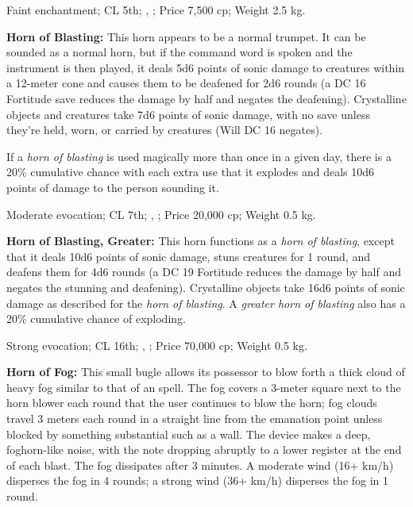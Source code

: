 Faint enchantment; CL 5th; , ; Price 7,500 cp; Weight 2.5 kg.



\textbf{Horn of Blasting:} This horn appears to be a normal trumpet. It can be sounded as a normal horn, but if the command word is spoken and the instrument is then played, it deals 5d6 points of sonic damage to creatures within a 12-meter cone and causes them to be deafened for 2d6 rounds (a DC 16 Fortitude save reduces the damage by half and negates the deafening). Crystalline objects and creatures take 7d6 points of sonic damage, with no save unless they're held, worn, or carried by creatures (Will DC 16 negates).

If a \emph{horn of blasting} is used magically more than once in a given day, there is a 20\% cumulative chance with each extra use that it explodes and deals 10d6 points of damage to the person sounding it.

Moderate evocation; CL 7th; , ; Price 20,000 cp; Weight 0.5 kg.



\textbf{Horn of Blasting, Greater:} This horn functions as a \emph{horn of blasting}, except that it deals 10d6 points of sonic damage, stuns creatures for 1 round, and deafens them for 4d6 rounds (a DC 19 Fortitude reduces the damage by half and negates the stunning and deafening). Crystalline objects take 16d6 points of sonic damage as described for the \emph{horn of blasting}. A \emph{greater horn of blasting} also has a 20\% cumulative chance of exploding.

Strong evocation; CL 16th; , ; Price 70,000 cp; Weight 0.5 kg.



\textbf{Horn of Fog:} This small bugle allows its possessor to blow forth a thick cloud of heavy fog similar to that of an  spell. The fog covers a 3-meter square next to the horn blower each round that the user continues to blow the horn; fog clouds travel 3 meters each round in a straight line from the emanation point unless blocked by something substantial such as a wall. The device makes a deep, foghorn-like noise, with the note dropping abruptly to a lower register at the end of each blast. The fog dissipates after 3 minutes. A moderate wind (16+ km/h) disperses the fog in 4 rounds; a strong wind (36+ km/h) disperses the fog in 1 round.

